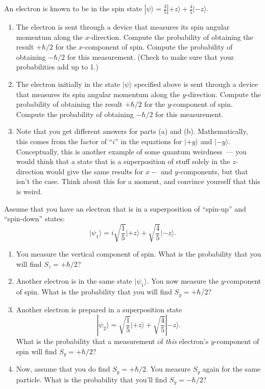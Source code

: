 \begin{problem}
An electron is known to be in the spin state $|\psi\rangle =
  \frac{3}{5}|\mbox{$+z$}\rangle + \frac{4}{5}|\mbox{$-z$}\rangle$.

  \begin{enumerate}
  \item The electron is sent
  through a device that measures its spin angular momentum along the
  $x$-direction.  Compute the probability of obtaining the result
  $+\hbar/2$ for the $x$-component of spin.  Compute the
  probability of obtaining $-\hbar/2$ for this measurement.  (Check to make
  sure that your probabilities add up to 1.)
  \item The electron initially in the state $|\psi\rangle$ specified
  above is sent through a device that measures its spin angular
  momentum along the $y$-direction.  Compute the probability of
  obtaining the result $+\hbar/2$ for the $y$-component of spin.
  Compute the probability of obtaining $-\hbar/2$ for this
  measurement.
  \item Note that you get different answers for parts (a) and (b).
  Mathematically, this comes from the factor of ``$i$'' in the
  equations for $|\mbox{$+y$}\rangle$ and $|\mbox{$-y$}\rangle$.
  Conceptually, this is another example of some quantum weirdness~---
  you would think that a state that is a superposition of stuff solely
  in the $z$-direction would give the same results for $x-$ and
  $y$-components, but that isn't the case.  Think about this for a
  moment, and convince yourself that this is weird.
 \end{enumerate}
\label{prob:spin_ii}
\end{problem}


\begin{problem}
  Assume that you have an electron that is in a superposition of
  ``spin-up'' and ``spin-down'' states:
  \[  
      \vert\psi_1\rangle = i \sqrt{\frac{1}{5}}\vert\mbox{$+z$}\rangle
                   + \sqrt{\frac{4}{5}}\vert\mbox{$-z$}\rangle 
  .  \]

  \begin{enumerate}
  \item You measure the vertical component of spin. What is the
    probability that you will find $S_z = + \hbar/2$?
  \item Another electron is in the same state $|\psi_1\rangle$.  You
    now measure the $y$-component of spin. What is the probability
    that you will find $S_y = + \hbar/2$? 

  \item Another electron is prepared in a superposition state
    \[ |\psi_2\rangle =  
    \sqrt{\frac{1}{5}}\vert\mbox{$+z$}\rangle
    +  \sqrt{\frac{4}{5}} |\mbox{$-z$}\rangle. \] 
    What is the
    probability that a measurement of {\em this} electron's
    $y$-component of spin will find $S_y = + \hbar/2$? 
  \item Now, assume that you do find $S_y = + \hbar/2$. You measure
    $S_y$ again for the same particle. What is the probability that
    you'll find $S_y = -\hbar/2$?
  \end{enumerate}
  \label{prob:spin_iv}
\end{problem}


